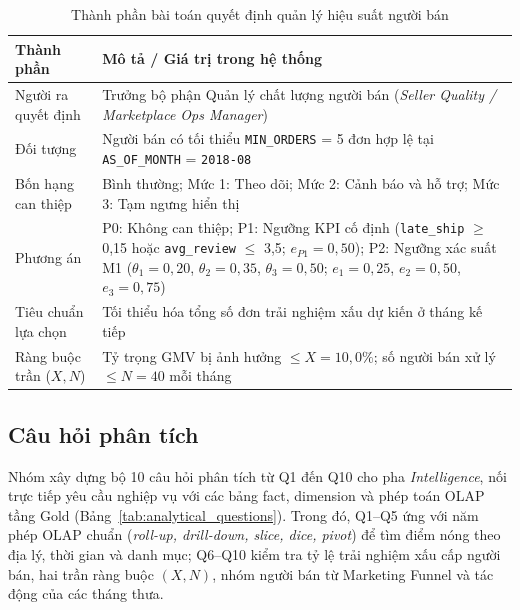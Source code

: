 \documentclass[a4paper]{article}
\begin{document}
\begin{table}[htbp]
\centering
\caption{Thành phần bài toán quyết định quản lý hiệu suất người bán}
\label{tab:decision_problem}
\begin{tabularx}{\textwidth}{lX}
\toprule
\textbf{Thành phần} & \textbf{Mô tả / Giá trị trong hệ thống} \\
\midrule
Người ra quyết định & Trưởng bộ phận Quản lý chất lượng người bán (\textit{Seller Quality / Marketplace Ops Manager}) \\
Đối tượng & Người bán có tối thiểu \texttt{MIN\_ORDERS} = 5 đơn hợp lệ tại \texttt{AS\_OF\_MONTH} = \texttt{2018-08} \\
Bốn hạng can thiệp & Bình thường; Mức 1: Theo dõi; Mức 2: Cảnh báo và hỗ trợ; Mức 3: Tạm ngưng hiển thị \\
Phương án & P0: Không can thiệp; P1: Ngưỡng KPI cố định (\texttt{late\_ship} $\ge$ 0,15 hoặc \texttt{avg\_review} $\le$ 3,5; $e_{P1} = 0,50$); P2: Ngưỡng xác suất M1 ($\theta_1 = 0,20$, $\theta_2 = 0,35$, $\theta_3 = 0,50$; $e_1 = 0,25$, $e_2 = 0,50$, $e_3 = 0,75$) \\
Tiêu chuẩn lựa chọn & Tối thiểu hóa tổng số đơn trải nghiệm xấu dự kiến ở tháng kế tiếp \\
Ràng buộc trần ($X, N$) & Tỷ trọng GMV bị ảnh hưởng $\le X = 10,0\%$; số người bán xử lý $\le N = 40$ mỗi tháng \\
\bottomrule
\end{tabularx}
\end{table}

\subsection{Câu hỏi phân tích}
\label{subsec:1_3}

Nhóm xây dựng bộ 10 câu hỏi phân tích từ Q1 đến Q10 cho pha \textit{Intelligence}, nối trực tiếp yêu cầu nghiệp vụ với các bảng fact, dimension và phép toán OLAP tầng Gold (Bảng~\ref{tab:analytical_questions}). Trong đó, Q1--Q5 ứng với năm phép OLAP chuẩn (\textit{roll-up, drill-down, slice, dice, pivot}) để tìm điểm nóng theo địa lý, thời gian và danh mục; Q6--Q10 kiểm tra tỷ lệ trải nghiệm xấu cấp người bán, hai trần ràng buộc $(X, N)$, nhóm người bán từ Marketing Funnel và tác động của các tháng thưa.
\end{document}
